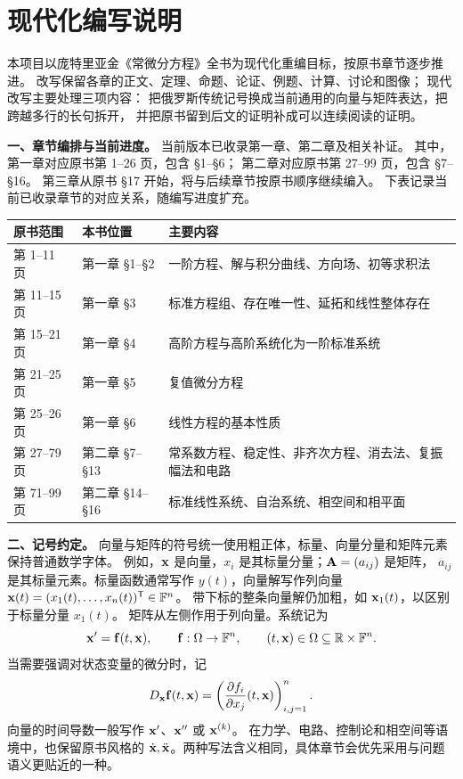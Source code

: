 \chapter*{现代化编写说明}

本项目以庞特里亚金《常微分方程》全书为现代化重编目标，按原书章节逐步推进。
改写保留各章的正文、定理、命题、论证、例题、计算、讨论和图像；
现代改写主要处理三项内容：
把俄罗斯传统记号换成当前通用的向量与矩阵表达，把跨越多行的长句拆开，
并把原书留到后文的证明补成可以连续阅读的证明。

\noindent\textbf{一、章节编排与当前进度。}
当前版本已收录第一章、第二章及相关补证。
其中，第一章对应原书第 1--26 页，包含 \S1--\S6；
第二章对应原书第 27--99 页，包含 \S7--\S16。
第三章从原书 \S17 开始，将与后续章节按原书顺序继续编入。
下表记录当前已收录章节的对应关系，随编写进度扩充。

\begin{center}
\small
\setlength{\tabcolsep}{4pt}
\begin{tabularx}{\textwidth}{@{}p{2.5cm}p{3.1cm}X@{}}
\toprule
原书范围 & 本书位置 & 主要内容\\
\midrule
第 1--11 页 & 第一章 \S1--\S2 &
一阶方程、解与积分曲线、方向场、初等求积法\\
第 11--15 页 & 第一章 \S3 &
标准方程组、存在唯一性、延拓和线性整体存在\\
第 15--21 页 & 第一章 \S4 &
高阶方程与高阶系统化为一阶标准系统\\
第 21--25 页 & 第一章 \S5 & 复值微分方程\\
第 25--26 页 & 第一章 \S6 & 线性方程的基本性质\\
第 27--79 页 & 第二章 \S7--\S13 &
常系数方程、稳定性、非齐次方程、消去法、复振幅法和电路\\
第 71--99 页 & 第二章 \S14--\S16 &
标准线性系统、自治系统、相空间和相平面\\
\bottomrule
\end{tabularx}
\end{center}

\noindent\textbf{二、记号约定。}
向量与矩阵的符号统一使用粗正体，标量、向量分量和矩阵元素保持普通数学字体。
例如，$\vect{x}$ 是向量，$x_i$ 是其标量分量；$\mathbf{A}=(a_{ij})$ 是矩阵，
$a_{ij}$ 是其标量元素。标量函数通常写作 $y(t)$，向量解写作列向量
$\vect{x}(t)=(x_1(t),\ldots,x_n(t))^{\mathsf T}\in\mathbb F^n$。
带下标的整条向量解仍加粗，如 $\vect{x}_1(t)$，以区别于标量分量 $x_1(t)$。
矩阵从左侧作用于列向量。系统记为
\[
 \vect{x}'=\vect{f}(t,\vect{x}),\qquad \vect{f}:\Omega\to\mathbb F^n,
 \qquad (t,\vect{x})\in\Omega\subseteq\mathbb R\times\mathbb F^n.
\]
当需要强调对状态变量的微分时，记
\[
 D_{\vect{x}}\vect{f}(t,\vect{x})
 =\left(\frac{\partial f_i}{\partial x_j}(t,\vect{x})\right)_{i,j=1}^n.
\]
向量的时间导数一般写作 $\vect{x}'$、$\vect{x}''$ 或 $\vect{x}^{(k)}$。
在力学、电路、控制论和相空间等语境中，也保留原书风格的
$\dot{\vect{x}},\ddot{\vect{x}}$。两种写法含义相同，具体章节会优先采用与问题语义更贴近的一种。

